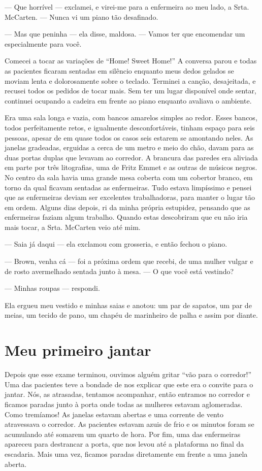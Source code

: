 --- Que horrível --- exclamei, e virei-me para a enfermeira ao meu lado,
a Srta. McCarten. --- Nunca vi um piano tão desafinado.

--- Mas que peninha --- ela disse, maldosa. --- Vamos ter que encomendar
um especialmente para você.

Comecei a tocar as variações de ``Home! Sweet Home!'' A conversa parou e
todas as pacientes ficaram sentadas em silêncio enquanto meus dedos
gelados se moviam lenta e dolorosamente sobre o teclado. Terminei a
canção, desajeitada, e recusei todos os pedidos de tocar mais. Sem ter
um lugar disponível onde sentar, continuei ocupando a cadeira em frente
ao piano enquanto avaliava o ambiente.

Era uma sala longa e vazia, com bancos amarelos simples ao redor. Esses
bancos, todos perfeitamente retos, e igualmente desconfortáveis, tinham
espaço para seis pessoas, apesar de em quase todos os casos seis estarem
se amontando neles. As janelas gradeadas, erguidas a cerca de um metro e
meio do chão, davam para as duas portas duplas que levavam ao corredor.
A brancura das paredes era aliviada em parte por três litografias, uma
de Fritz Emmet e as outras de músicos negros. No centro da sala havia
uma grande mesa coberta com um cobertor branco, em torno da qual ficavam
sentadas as enfermeiras. Tudo estava limpíssimo e pensei que as
enfermeiras deviam ser excelentes trabalhadoras, para manter o lugar tão
em ordem. Alguns dias depois, ri da minha própria estupidez, pensando
que as enfermeiras faziam algum trabalho. Quando estas descobriram que
eu não iria mais tocar, a Srta. McCarten veio até mim.

--- Saia já daqui --- ela exclamou com grosseria, e então fechou o
piano.

--- Brown, venha cá --- foi a próxima ordem que recebi, de uma mulher
vulgar e de rosto avermelhado sentada junto à mesa. --- O que você está
vestindo?

--- Minhas roupas --- respondi.

Ela ergueu meu vestido e minhas saias e anotou: um par de sapatos, um
par de meias, um tecido de pano, um chapéu de marinheiro de palha e
assim por diante.

\chapter{Meu primeiro
jantar}\label{capuxedtulo-x-meu-primeiro-jantar}

Depois que esse exame terminou, ouvimos alguém gritar ``vão para o
corredor!'' Uma das pacientes teve a bondade de nos explicar que este
era o convite para o jantar. Nós, as atrasadas, tentamos acompanhar,
então entramos no corredor e ficamos paradas junto à porta onde todas as
mulheres estavam aglomeradas. Como tremíamos! As janelas estavam abertas
e uma corrente de vento atravessava o corredor. As pacientes estavam
azuis de frio e os minutos foram se acumulando até somarem um quarto de
hora. Por fim, uma das enfermeiras apareceu para destrancar a porta, que
nos levou até a plataforma no final da escadaria. Mais uma vez, ficamos
paradas diretamente em frente a uma janela aberta.

